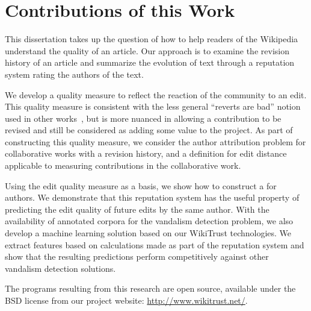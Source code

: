 \section{Contributions of this Work}

This dissertation takes up the question of how to help readers of the
Wikipedia understand the quality of an article.
Our approach is to examine the revision history of an article
and summarize the evolution of text through a reputation system
rating the authors of the text.

We develop a quality measure to reflect the reaction of
the community to an edit.
This quality measure is consistent with the less general
``reverts are bad'' notion used in other
works~\cite{Smets2008,Itakura2009,Belani2010,West2010},
but is more nuanced in allowing a contribution to be revised
and still be considered as adding some value to the project.
As part of constructing this quality measure, we consider the
author attribution problem for collaborative works with a revision
history, and a definition for edit distance applicable to
measuring contributions in the collaborative work.

Using the edit quality measure as a basis, we show how
to construct a  for authors.
We demonstrate that this reputation system has the useful property
of predicting the edit quality of future edits by the same
author.
With the availability of annotated corpora for the vandalism
detection problem, we also develop a machine learning solution based on our
WikiTrust technologies.
We extract features based on calculations made as part of the
reputation system and show that the resulting predictions perform
competitively against other vandalism detection solutions.

The programs resulting from this research are open source,
available under the BSD license from our project website:
\url{http://www.wikitrust.net/}.

